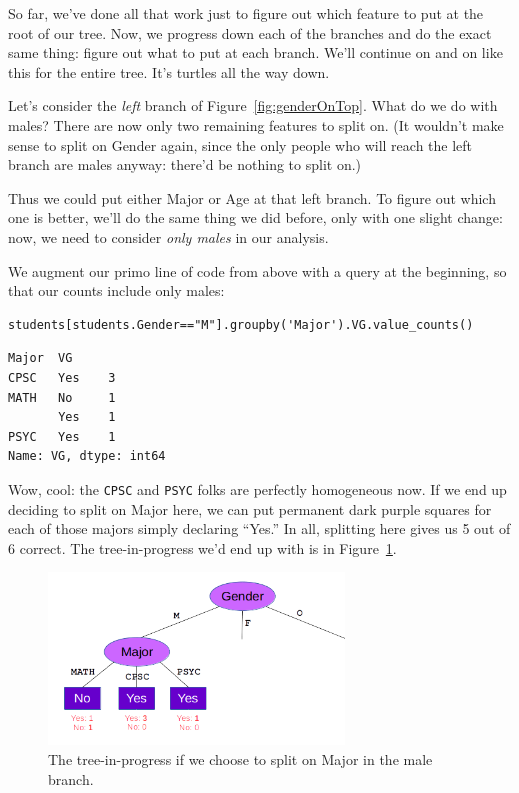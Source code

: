 
So far, we've done all that work just to figure out which feature to put at the
root of our tree. Now, we progress down each of the branches and do the exact
same thing: figure out what to put at each branch. We'll continue on and on
like this for the entire tree. It's turtles all the way down.


Let's consider the \textit{left} branch of Figure~\ref{fig:genderOnTop}. What
do we do with males? There are now only two remaining features to split on. (It
wouldn't make sense to split on \textsf{Gender} again, since the only people
who will reach the left branch are males anyway: there'd be nothing to split
on.)

Thus we could put either \textsf{Major} or \textsf{Age} at that left branch. To
figure out which one is better, we'll do the same thing we did before, only
with one slight change: now, we need to consider \textit{only males} in our
analysis.

We augment our primo line of code from above with a query at the beginning, so
that our counts include only males:

\begin{Verbatim}[fontsize=\footnotesize,samepage=true,frame=single,framesep=3mm]
students[students.Gender=="M"].groupby('Major').VG.value_counts()
\end{Verbatim}
\vspace{-.2in}

\begin{Verbatim}[fontsize=\small,samepage=true,frame=leftline,framesep=5mm,framerule=1mm]
Major  VG 
CPSC   Yes    3
MATH   No     1
       Yes    1
PSYC   Yes    1
Name: VG, dtype: int64
\end{Verbatim}

Wow, cool: the \texttt{CPSC} and \texttt{PSYC} folks are perfectly homogeneous
now. If we end up deciding to split on \textsf{Major} here, we can put
permanent dark purple squares for each of those majors simply declaring
``Yes.'' In all, splitting here gives us 5 out of 6 correct. The
tree-in-progress we'd end up with is in Figure~\ref{fig:maleMajorSplit}.

\begin{figure}[ht]
\centering
\includegraphics[width=0.7\textwidth]{maleMajorSplit.png}
\caption{The tree-in-progress if we choose to split on \textsf{Major} in the
male branch.}
\label{fig:maleMajorSplit}
\end{figure}

